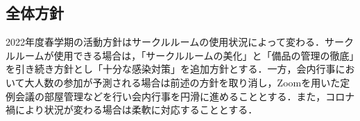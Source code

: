 \subsection*{全体方針}


2022年度春学期の活動方針はサークルルームの使用状況によって変わる．サークルルームが使用できる場合は，「サークルルームの美化」と「備品の管理の徹底」を引き続き方針とし「十分な感染対策」を追加方針とする．一方，会内行事において大人数の参加が予測される場合は前述の方針を取り消し，Zoomを用いた定例会議の部屋管理などを行い会内行事を円滑に進めることとする．また，コロナ禍により状況が変わる場合は柔軟に対応することとする．
